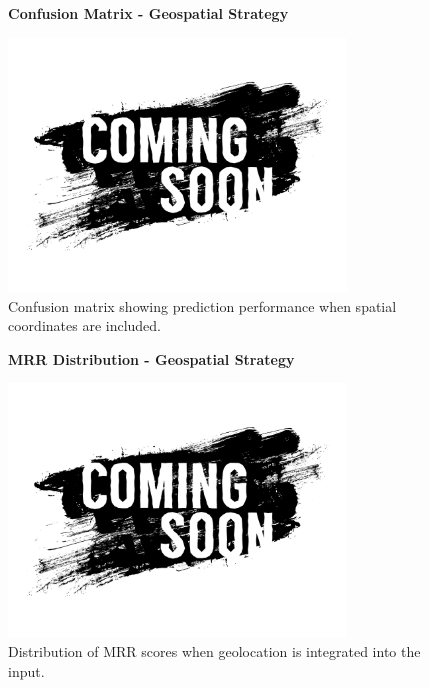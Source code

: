 \documentclass[12pt,a4paper]{article}
\begin{document}
\begin{enumerate}
\begin{figure}[H]
\centering
\textbf{Confusion Matrix - Geospatial Strategy}\par
\vspace{0.5em}
\includegraphics[width=0.8\textwidth]{../img/SPACE-GEO_n-1_come_current_POI/tmp.jpg}
\caption{Confusion matrix showing prediction performance when spatial coordinates are included.}
\label{fig:geospatial_confusion}
\end{figure}

\begin{figure}[H]
\centering
\textbf{MRR Distribution - Geospatial Strategy}\par
\vspace{0.5em}
\includegraphics[width=0.8\textwidth]{../img/SPACE-GEO_n-1_come_current_POI/tmp.jpg}
\caption{Distribution of MRR scores when geolocation is integrated into the input.}
\label{fig:geospatial_mrr}
\end{figure}


\end{enumerate}
\end{document}
